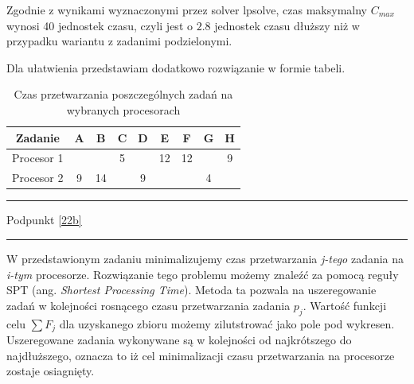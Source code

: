 \documentclass[
    12pt, %
]{../fphw}
\begin{document}
Zgodnie z wynikami wyznaczonymi przez solver lpsolve, czas maksymalny \(C_{max}\) wynosi 40 jednostek czasu,
czyli jest o \(2.8\) jednostek czasu dłuższy niż w przypadku wariantu z zadanimi podzielonymi.

Dla ułatwienia przedstawiam dodatkowo rozwiązanie w formie tabeli.
\begin{table}[H]
    \centering
    \begin{tabular}{| c | c | c | c | c | c | c | c | c |}
        \hline
        Zadanie    & A & B  & C & D & E  & F  & G & H \\
        \hline
        Procesor 1 &   &    & 5 &   & 12 & 12 &   & 9 \\
        \hline
        Procesor 2 & 9 & 14 &   & 9 &    &    & 4 &   \\
        \hline
    \end{tabular}
    \caption{Czas przetwarzania poszczególnych zadań na wybranych procesorach}
\end{table}

\newpage

\par\noindent\rule{\textwidth}{0.4pt}
Podpunkt \ref{22b}
\par\noindent\rule{\textwidth}{0.4pt}
W przedstawionym zadaniu minimalizujemy czas przetwarzania \textit{j-tego}
zadania na \textit{i-tym} procesorze.
Rozwiązanie tego problemu możemy znaleźć za pomocą reguły SPT (ang. \textit{Shortest Processing Time}).
Metoda ta pozwala na uszeregowanie zadań w kolejności rosnącego czasu przetwarzania zadania \(p_j\).
Wartość funkcji celu \(\sum F_j\) dla uzyskanego zbioru możemy zilutstrować jako pole pod wykresen.
Uszeregowane zadania wykonywane są w kolejności od najkrótszego do najdłuższego,
oznacza to iż cel minimalizacji czasu przetwarzania na procesorze zostaje osiagnięty.
\end{document}
